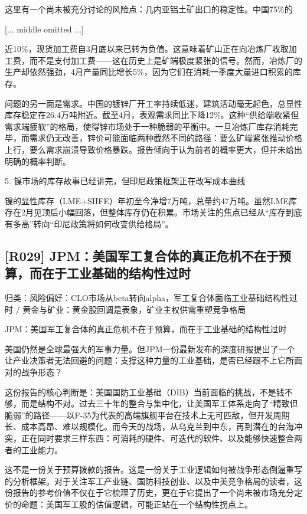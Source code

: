 \documentclass[11pt]{ctexart}
\begin{document}
这里有一个尚未被充分讨论的风险点：几内亚铝土矿出口的稳定性。中国75\%的

[... middle omitted ...]

近10\%，现货加工费自3月底以来已转为负值。这意味着矿山正在向冶炼厂收取加工费，而不是支付加工费——这在历史上是矿端极度紧张的信号。然而，冶炼厂的生产却依然强劲，4月产量同比增长5\%，因为它们在消耗一季度大量进口积累的库存。

问题的另一面是需求。中国的镀锌厂开工率持续低迷，建筑活动毫无起色，总显性库存稳定在26.4万吨附近。截至4月，表观需求同比下降12\%。这种“供给端收紧但需求端疲软”的格局，使得锌市场处于一种脆弱的平衡中。一旦冶炼厂库存消耗完毕，而需求仍无改善，锌价可能面临两种截然不同的路径：要么矿端紧张推动价格上行，要么需求崩溃导致价格暴跌。报告倾向于认为前者的概率更大，但并未给出明确的概率判断。

5. 镍市场的库存故事已经讲完，但印尼政策框架正在改写成本曲线

镍的显性库存（LME+SHFE）年初至今净增7万吨，总量约47万吨。虽然LME库存在2月见顶后小幅回落，但整体库存仍在积累。市场关注的焦点已经从“库存到底有多高”转向“印尼政策将如何改变供给格局”。

\subsection{[R029] JPM：美国军工复合体的真正危机不在于预算，而在于工业基础的结构性过时}
{\small\color{refgray}归类：风险偏好：CLO市场从beta转向alpha，军工复合体面临工业基础结构性过时 / 黄金与矿业：黄金股回调是表象，矿业主权供需重塑竞争格局}

JPM：美国军工复合体的真正危机不在于预算，而在于工业基础的结构性过时

美国仍然是全球最强大的军事力量。但JPM一份最新发布的深度研报提出了一个让产业决策者无法回避的问题：支撑这种力量的工业基础，是否已经跟不上它所面对的战争形态？

这份报告的核心判断是：美国国防工业基础（DIB）当前面临的挑战，不是钱不够，而是结构不对。过去三十年的整合与集中化，让美国军工体系走向了“精致但脆弱”的路径——以F-35为代表的高端旗舰平台在技术上无可匹敌，但开发周期长、成本高昂、难以规模化。而今天的战场，从乌克兰到中东，再到潜在的台海冲突，正在同时要求三样东西：可消耗的硬件、可迭代的软件、以及能够快速整合两者的工业能力。

这不是一份关于预算拨款的报告。这是一份关于工业逻辑如何被战争形态倒逼重写的分析框架。对于关注军工产业链、国防科技创业、以及中美竞争格局的读者，这份报告的参考价值不仅在于它梳理了历史，更在于它提出了一个尚未被市场充分定价的命题：美国军工股的估值逻辑，可能正站在一个结构性拐点上。
\end{document}
